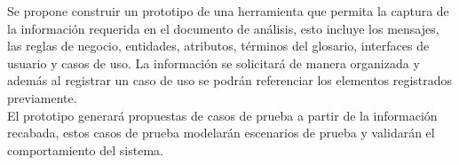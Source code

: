 Se propone construir un prototipo de una herramienta que permita la captura de la información requerida en el documento de análisis, 
esto incluye los mensajes, las reglas de negocio, entidades, atributos, términos del glosario, interfaces de usuario y casos de uso. La información se solicitará de 
manera organizada y además al registrar un caso de uso se podrán referenciar los elementos registrados previamente.\\

El prototipo generará propuestas de casos de prueba a partir de la información recabada, estos casos de prueba modelarán escenarios 
de prueba y validarán el comportamiento del sistema. \\


